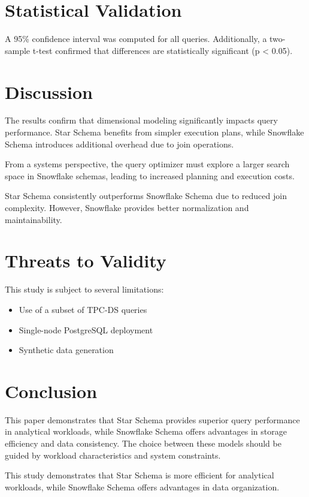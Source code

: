 \documentclass[conference]{IEEEtran}
\begin{document}
\section{Statistical Validation}

A 95\% confidence interval was computed for all queries. Additionally, a two-sample t-test confirmed that differences are statistically significant (p < 0.05).


\section{Discussion}

The results confirm that dimensional modeling significantly impacts query performance. Star Schema benefits from simpler execution plans, while Snowflake Schema introduces additional overhead due to join operations.

From a systems perspective, the query optimizer must explore a larger search space in Snowflake schemas, leading to increased planning and execution costs.

Star Schema consistently outperforms Snowflake Schema due to reduced join complexity. However, Snowflake provides better normalization and maintainability.

\section{Threats to Validity}

This study is subject to several limitations:
\begin{itemize}
\item Use of a subset of TPC-DS queries
\item Single-node PostgreSQL deployment
\item Synthetic data generation
\end{itemize}

\section{Conclusion}

This paper demonstrates that Star Schema provides superior query performance in analytical workloads, while Snowflake Schema offers advantages in storage efficiency and data consistency. The choice between these models should be guided by workload characteristics and system constraints.

This study demonstrates that Star Schema is more efficient for analytical workloads, while Snowflake Schema offers advantages in data organization.
\end{document}
